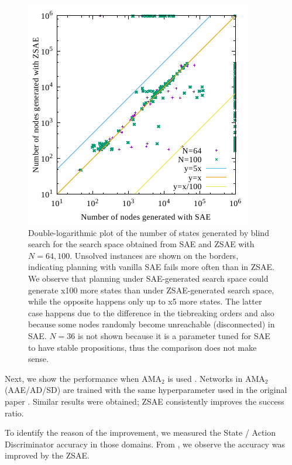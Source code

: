 \begin{figure}[htb]
 \centering
 \includegraphics{img/static/gen.pdf}
 \caption{Double-logarithmic plot of the number of states generated by blind search
for the search space obtained from SAE and ZSAE with $N=64,100$. 
Unsolved instances are shown on the borders, indicating planning with vanilla SAE fails more often than in ZSAE.
We observe that planning under SAE-generated search space could generate x100 more states
than under ZSAE-generated search space, while the opposite happens only up to x5 more states.
The latter case happens due to the difference in the tiebreaking orders and also because some nodes randomly become unreachable (disconnected) in SAE.
$N=36$ is not shown because
it is a parameter tuned for SAE to have stable propositions, thus the comparison does not make sense.
}
 \label{fig:ama1-visited}
\end{figure}

Next, we show the performance when AMA$_2$ is used
. Networks in AMA$_2$ (AAE/AD/SD) are trained with the same hyperparameter 
used in the original paper \cite{Asai2018}.
Similar results were obtained; ZSAE consistently improves the success ratio.

\begin{table}[htb]
 \vspace{1.5in}
 \caption{}
 \label{tab:ama2}
\end{table}

To identify the reason of the improvement, we measured the State / Action Discriminator accuracy in those domains.
From , we observe the accuracy was improved by the ZSAE.

